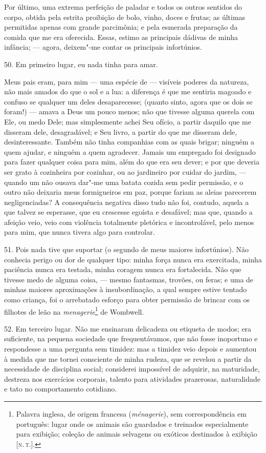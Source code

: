 Por último, uma extrema perfeição de paladar e todos os outros sentidos
do corpo, obtida pela estrita proibição de bolo, vinho, doces e frutas;
as últimas permitidas apenas com grande parcimônia; e pela esmerada
preparação da comida que me era oferecida. Essas, estimo as principais
dádivas de minha infância; --- agora, deixem"-me contar os principais
infortúnios.

50. Em primeiro lugar, eu nada tinha para amar.

Meus pais eram, para mim --- uma espécie de --- visíveis poderes da
natureza, não mais amados do que o sol e a lua: a diferença é que me
sentiria magoado e confuso se qualquer um deles desaparecesse; (quanto
sinto, agora que os dois se foram!) --- amava a Deus um pouco menos; não
que tivesse alguma querela com Ele, ou medo Dele; mas simplesmente achei
Seu ofício, a partir daquilo que me disseram dele, desagradável; e Seu
livro, a partir do que me disseram dele, desinteressante. Também não
tinha companhias com as quais brigar; ninguém a quem ajudar, e ninguém a
quem agradecer. Jamais um empregado foi designado para fazer qualquer
coisa para mim, além do que era seu dever; e por que deveria ser grato à
cozinheira por cozinhar, ou ao jardineiro por cuidar do jardim, ---
quando um não ousava dar"-me uma batata cozida sem pedir permissão, e o
outro não deixaria meus formigueiros em paz, porque fariam as aleias
parecerem negligenciadas? A consequência negativa disso tudo não foi,
contudo, aquela a que talvez se esperasse, que eu crescesse egoísta e
desafável; mas que, quando a afeição veio, veio com violência totalmente
pletórica e incontrolável, pelo menos para mim, que nunca tivera algo
para controlar.

51. Pois nada tive que suportar (o segundo de meus maiores infortúnios).
Não conhecia perigo ou dor de qualquer tipo: minha força nunca era
exercitada, minha paciência nunca era testada, minha coragem nunca era
fortalecida. Não que tivesse medo de alguma coisa, --- mesmo fantasmas,
trovões, ou feras; e uma de minhas maiores aproximações à
insubordinação, a qual sempre estive tentado como criança, foi o
arrebatado esforço para obter permissão de brincar com os filhotes de
leão na \emph{menagerie}\footnote{Palavra inglesa, de origem francesa
  (\emph{ménagerie}), sem correspondência em português: lugar onde os
  animais são guardados e treinados especialmente para exibição; coleção
  de animais selvagens ou exóticos destinados à exibição {[}\textsc{n.\,t.}{]}.}
de Wombwell.

52. Em terceiro lugar. Não me ensinaram delicadeza ou etiqueta de modos;
era suficiente, na pequena sociedade que frequentávamos, que não fosse
inoportuno e respondesse a uma pergunta sem timidez: mas a timidez veio
depois e aumentou à medida que me tornei consciente de minha rudeza, que
se revelou a partir da necessidade de disciplina social; considerei
impossível de adquirir, na maturidade, destreza nos exercícios
corporais, talento para atividades prazerosas, naturalidade e tato no
comportamento cotidiano.

